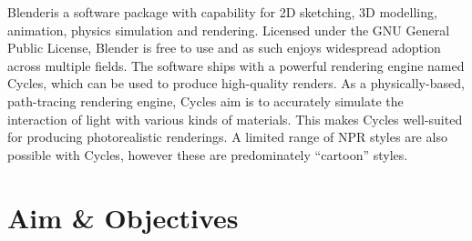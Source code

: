 Blender\footnotemark is a software package with capability for 2D sketching, 3D modelling, animation, physics simulation and rendering.
Licensed under the GNU General Public License, Blender is free to use and as such enjoys widespread adoption across multiple fields.
The software ships with a powerful rendering engine named Cycles, which can be used to produce high-quality renders.
As a physically-based, path-tracing rendering engine, Cycles aim is to accurately simulate the interaction of light with various kinds of materials.
This makes Cycles well-suited for producing photorealistic renderings.
A limited range of NPR styles are also possible with Cycles, however these are predominately ``cartoon'' styles.

\footnotetext{}

\section{Aim \& Objectives}

